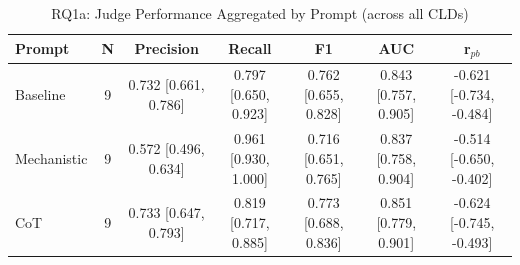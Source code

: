 \begin{table}[htbp]
\centering
\caption{RQ1a: Judge Performance Aggregated by Prompt (across all CLDs)}
\label{tab:rq1a_by_prompt}
\begin{tabular}{lcccccc}
\toprule
\textbf{Prompt} & \textbf{N} & \textbf{Precision} & \textbf{Recall} & \textbf{F1} & \textbf{AUC} & \textbf{r$_{pb}$} \\
\midrule
Baseline & 9 & 0.732 [0.661, 0.786] & 0.797 [0.650, 0.923] & 0.762 [0.655, 0.828] & 0.843 [0.757, 0.905] & -0.621 [-0.734, -0.484] \\
Mechanistic & 9 & 0.572 [0.496, 0.634] & 0.961 [0.930, 1.000] & 0.716 [0.651, 0.765] & 0.837 [0.758, 0.904] & -0.514 [-0.650, -0.402] \\
CoT & 9 & 0.733 [0.647, 0.793] & 0.819 [0.717, 0.885] & 0.773 [0.688, 0.836] & 0.851 [0.779, 0.901] & -0.624 [-0.745, -0.493] \\
\bottomrule
\end{tabular}
\end{table}